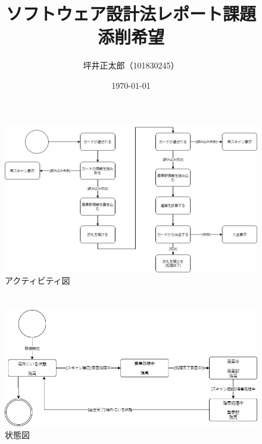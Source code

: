 \documentclass[a4paper,10pt]{jsarticle}
\begin{document}
\title{ソフトウェア設計法レポート課題\\添削希望}
\author{坪井正太郎（101830245）}
\date{\today}
\maketitle
\section{}
\begin{figure}[H]
  \centering
  \includegraphics[width=\linewidth]{01.drawio.png}
  \caption{アクティビティ図}
  \label{アクティビティ図}
\end{figure}


\section{}
\begin{figure}[H]
  \centering
  \includegraphics[width=\linewidth]{02.drawio.png}
  \caption{状態図}
  \label{状態図}
\end{figure}
\end{document}

